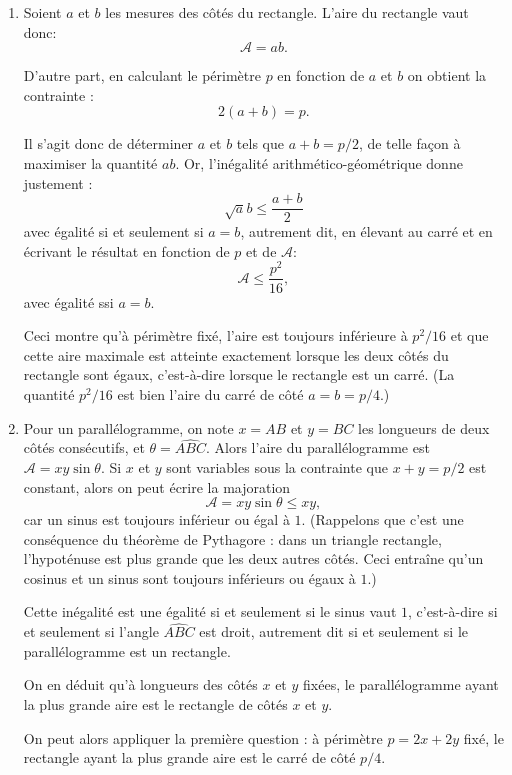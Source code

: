 \begin{Soln}{68}
\begin{enumerate}
\item
Soient $a$ et $b$ les mesures des côtés du rectangle. L'aire du rectangle vaut donc:
\[ \mathcal A=ab.\]

D'autre part, en  calculant le périmètre $p$  en fonction de $a$ et $b$ on obtient la contrainte :
\[ 2(a+b)=p.\]

Il s'agit donc de déterminer $a$ et $b$ tels que $a+b=p/2$, de telle façon à maximiser la quantité $ab$. Or, l'inégalité arithmético-géométrique donne justement :
\[ \sqrt ab \leq \frac{a+b}{2} \]
avec égalité si et seulement si $a=b$, autrement dit, en élevant au carré et en écrivant le résultat en fonction de $p$ et de $\mathcal A$:
\[ \mathcal A \leq \frac{p^2}{16},\]
avec égalité ssi $a=b$.

Ceci montre qu'à périmètre fixé, l'aire est toujours inférieure à $p^2/16$ et que cette aire maximale est atteinte exactement lorsque les deux côtés du rectangle sont égaux, c'est-à-dire lorsque le rectangle est un carré. (La quantité $p^2/16$ est bien l'aire du carré de côté $a=b=p/4$.)



\item Pour un parallélogramme, on note $x=AB$ et $y=BC$ les longueurs de deux côtés consécutifs, et $\theta = \widehat{ABC}$. Alors l'aire du parallélogramme est $\mathcal A = xy\sin\theta$.  Si $x$ et $y$ sont variables sous la contrainte que $x+y = p/2$ est constant, alors on peut écrire la majoration
\[\mathcal A = xy\sin\theta \leq xy,\]
car un sinus est toujours inférieur ou égal à $1$. (Rappelons que c'est une conséquence du théorème de Pythagore : dans un triangle rectangle, l'hypoténuse est plus grande que les deux autres côtés. Ceci entraîne qu'un cosinus et un sinus sont toujours inférieurs ou égaux à $1$.)

Cette inégalité est une égalité si et seulement si le sinus vaut $1$, c'est-à-dire si et seulement si l'angle $\widehat{ABC}$ est droit, autrement dit si et seulement si le parallélogramme est un rectangle.

On en déduit qu'à longueurs des côtés $x$ et $y$ fixées, le parallélogramme ayant la plus grande aire est le rectangle de côtés $x$ et $y$.

On peut alors appliquer la première question : à périmètre $p = 2x+2y$ fixé, le rectangle ayant la plus grande aire est le carré de côté $p/4$.
\end{enumerate}
\end{Soln}
